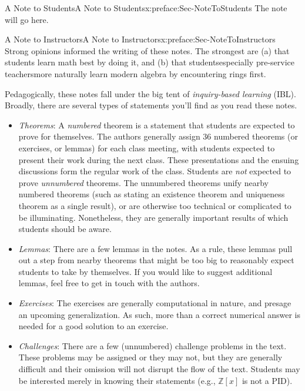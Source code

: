 \documentclass[oneside,10pt,]{book}
\numberwithin{equation}{section}
\def\Z{{\mathbb Z}}
\begin{document}
\typeout{************************************************}
%
\begin{preface}{A Note to Students}{}{A Note to Students}{}{}{x:preface:Sec-NoteToStudents}
The note will go here.%
\end{preface}
%
%
\typeout{************************************************}
\typeout{************************************************}
%
\begin{preface}{A Note to Instructors}{}{A Note to Instructors}{}{}{x:preface:Sec-NoteToInstructors}
Strong opinions informed the writing of these notes. The strongest are (a) that students learn math best by doing it, and (b) that students\textendash{}especially pre-service teachers\textendash{}more naturally learn modern algebra by encountering rings first.%
\par
Pedagogically, these notes fall under the big tent of \emph{inquiry-based learning} (IBL). Broadly, there are several types of statements you'll find as you read these notes.%
\begin{itemize}[label=\textbullet]
\item{}\emph{Theorems}: A \emph{numbered} theorem is a statement that students are expected to prove for themselves. The authors generally assign 3\textendash{}6 numbered theorems (or exercises, or lemmas) for each class meeting, with students expected to present their work during the next class. These presentations and the ensuing discussions form the regular work of the class. Students are \emph{not} expected to prove \emph{unnumbered} theorems. The unnumbered theorems unify nearby numbered theorems (such as stating an existence theorem and uniqueness theorem as a single result), or are otherwise too technical or complicated to be illuminating. Nonetheless, they are generally important results of which students should be aware.%
\item{}\emph{Lemmas}: There are a few lemmas in the notes. As a rule, these lemmas pull out a step from nearby theorems that might be too big to reasonably expect students to take by themselves. If you would like to suggest additional lemmas, feel free to get in touch with the authors.%
\item{}\emph{Exercises}: The exercises are generally computational in nature, and presage an upcoming generalization. As such, more than a correct numerical answer is needed for a good solution to an exercise.%
\item{}\emph{Challenges}: There are a few (unnumbered) challenge problems in the text. These problems may be assigned or they may not, but they are generally difficult and their omission will not disrupt the flow of the text. Students may be interested merely in knowing their statements (e.g., \(\Z[x]\) is not a PID).%

\end{itemize}
\end{preface}
\end{document}
